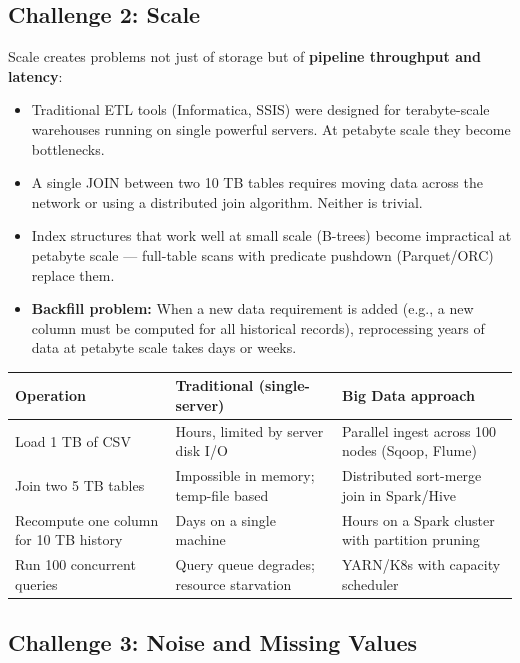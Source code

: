 \documentclass[12pt,a4paper]{article}
\begin{document}
\subsection{Challenge 2: Scale}

Scale creates problems not just of storage but of \textbf{pipeline throughput and latency}:
\begin{itemize}[leftmargin=1.8em]
  \item Traditional ETL tools (Informatica, SSIS) were designed for terabyte-scale warehouses running on single powerful servers.  At petabyte scale they become bottlenecks.
  \item A single JOIN between two 10 TB tables requires moving data across the network or using a distributed join algorithm.  Neither is trivial.
  \item Index structures that work well at small scale (B-trees) become impractical at petabyte scale — full-table scans with predicate pushdown (Parquet/ORC) replace them.
  \item \textbf{Backfill problem:} When a new data requirement is added (e.g., a new column must be computed for all historical records), reprocessing years of data at petabyte scale takes days or weeks.
\end{itemize}

\begin{center}
\renewcommand{\arraystretch}{1.4}
\begin{tabular}{p{3.5cm}p{4.5cm}p{4.5cm}}
  \toprule
  \textbf{Operation} & \textbf{Traditional (single-server)} & \textbf{Big Data approach} \\
  \midrule
  Load 1 TB of CSV & Hours, limited by server disk I/O & Parallel ingest across 100 nodes (Sqoop, Flume) \\
  Join two 5 TB tables & Impossible in memory; temp-file based & Distributed sort-merge join in Spark/Hive \\
  Recompute one column for 10 TB history & Days on a single machine & Hours on a Spark cluster with partition pruning \\
  Run 100 concurrent queries & Query queue degrades; resource starvation & YARN/K8s with capacity scheduler \\
  \bottomrule
\end{tabular}
\end{center}

\subsection{Challenge 3: Noise and Missing Values}
\end{document}
